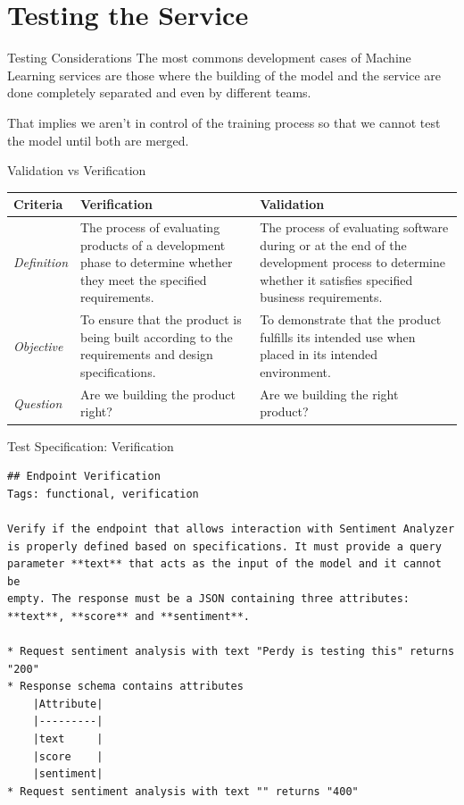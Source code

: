 \section{Testing the Service}
\begin{frame}{Testing Considerations}
    The most commons development cases of Machine Learning services are those where the building of the model and the service are done completely separated and even by different teams.

    That implies we aren't in control of the training process so that we cannot test the model until both are merged.
\end{frame}

\begin{frame}{Validation vs Verification}
    \begin{tabular}{lp{1.6in}p{1.6in}}
        \toprule
        \textbf{Criteria} & \textbf{Verification} & \textbf{Validation} \\
        \midrule
        \emph{Definition} & The process of evaluating products of a development phase to determine whether they meet the specified requirements. & The process of evaluating software during or at the end of the development process to determine whether it satisfies specified business requirements. \\
        \emph{Objective} & To ensure that the product is being built according to the requirements and design specifications. & To demonstrate that the product fulfills its intended use when placed in its intended environment. \\
        \emph{Question} & Are we building the product right? & Are we building the right product? \\
        \bottomrule
    \end{tabular}
\end{frame}

\begin{frame}[fragile]{Test Specification: Verification}
    \footnotesize{
        \begin{verbatim}
## Endpoint Verification
Tags: functional, verification

Verify if the endpoint that allows interaction with Sentiment Analyzer
is properly defined based on specifications. It must provide a query
parameter **text** that acts as the input of the model and it cannot be
empty. The response must be a JSON containing three attributes:
**text**, **score** and **sentiment**.

* Request sentiment analysis with text "Perdy is testing this" returns "200"
* Response schema contains attributes
    |Attribute|
    |---------|
    |text     |
    |score    |
    |sentiment|
* Request sentiment analysis with text "" returns "400"
        \end{verbatim}
    }
\end{frame}

